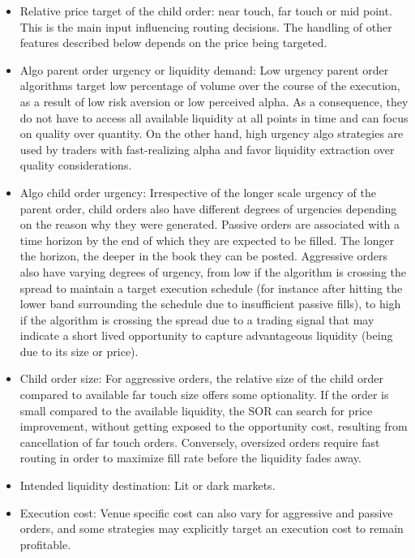 \begin{itemize}
\item Relative price target of the child order: near touch, far touch or mid point. This is the main input influencing routing decisions. The handling of other features described below depends on the price being targeted.

\item Algo parent order urgency or liquidity demand: Low urgency parent order algorithms target low percentage of volume over the course of the execution, as a result of low risk aversion or low perceived alpha. As a consequence, they do not have to access all available liquidity at all points in time and can focus on quality over quantity. On the other hand, high urgency algo strategies are used by traders with fast-realizing alpha and favor liquidity extraction over quality considerations.

\item Algo child order urgency: Irrespective of the longer scale urgency of the parent order, child orders also have different degrees of urgencies depending on the reason why they were generated. Passive orders are associated with a time horizon by the end of which they are expected to be filled. The longer the horizon, the deeper in the book they can be posted. Aggressive orders also have varying degrees of urgency, from low if the algorithm is crossing the spread to maintain a target execution schedule (for instance after hitting the lower band surrounding the schedule due to insufficient passive fills), to high if the algorithm is crossing the spread due to a trading signal that may indicate a short lived opportunity to capture advantageous liquidity (being due to its size or price).

\item Child order size: For aggressive orders, the relative size of the child order compared to available far touch size offers some optionality. If the order is small compared to the available liquidity, the SOR can search for price improvement, without getting exposed to the opportunity cost, resulting from cancellation of far touch orders. Conversely, oversized orders require fast routing in order to maximize fill rate before the liquidity fades away.

\item Intended liquidity destination: Lit or dark markets.

\item Execution cost: Venue specific cost can also vary for aggressive and passive orders, and some strategies may explicitly target an execution cost to remain profitable. \twomedskip
\end{itemize}



